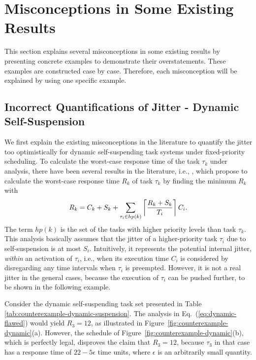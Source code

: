 
\section{Misconceptions in Some Existing Results}
\label{sec:misconceptions}

This section explains several misconceptions in some existing results by presenting concrete examples to demonstrate their overstatements. These examples are constructed case by case. Therefore, each misconception will be explained by using one specific example. 

\subsection{Incorrect Quantifications of Jitter - Dynamic Self-Suspension}
\label{sec:wrong-jitter-dynamic}

We first explain the existing misconceptions in the literature to quantify the jitter too optimistically for dynamic self-suspending task systems under fixed-priority scheduling. To calculate the worst-case response time of the task $\tau_k$ under analysis, there have been several results in the literature, i.e., \cite{ECRTS-AudsleyB04,RTAS-AudsleyB04,RTCSA-KimCPKH95},  which propose to calculate the worst-case response time $R_k$ of task $\tau_k$ by finding the minimum $R_k$ with
\begin{equation}
R_k = C_k+ S_k+\sum_{\tau_i \in hp(k)}\left\lceil{\frac{R_k+S_k}{T_i}}\right\rceil C_i.
\label{eq:dynamic-flawed}
\end{equation}
The term $hp(k)$ is the set of the tasks with higher priority levels than task $\tau_k$. This analysis basically assumes that the jitter of a higher-priority task $\tau_i$ due to self-suspension is at most $S_i$.  Intuitively, it represents the potential internal jitter, \textit{within} an activation of $\tau_i$, i.e., when its execution time $C_i$ is considered by disregarding any time intervals when $\tau_i$ is preempted. 
However, it is not a real jitter in the general cases, because the execution of $\tau_i$ can be pushed further, to be shown in the following example.


Consider the dynamic self-suspending task set presented in Table \ref{tab:counterexample-dynamic-suspension}. 
The analysis in Eq.~(\ref{eq:dynamic-flawed}) would yield $R_3=12$, as illustrated in 
Figure~\ref{fig:counterexample-dynamic}(a). However, the schedule of Figure~\ref{fig:counterexample-dynamic}(b), which is perfectly legal, 
disproves the claim that $R_3=12$, because $\tau_3$ in that case has a response time of $22-5\epsilon$ time units, 
where $\epsilon$ is an arbitrarily small quantity. 

